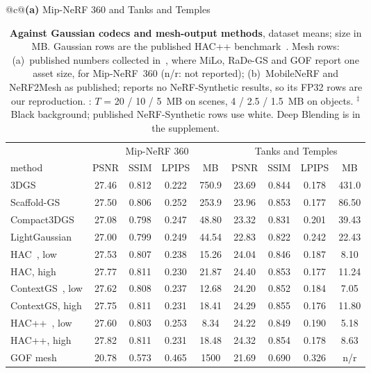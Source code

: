 \begin{table}[t]\centering\footnotesize
\caption{\textbf{Against Gaussian codecs and mesh-output methods}, dataset means; size in MB. Gaussian rows are the published HAC++ benchmark~\cite{hacpp2025}. Mesh rows: (a)~published numbers collected in~\cite{meshsplatting2025}, where MiLo, RaDe-GS and GOF report one asset size, for Mip-NeRF~360 (n/r: not reported); (b)~MobileNeRF and NeRF2Mesh as published; \MS reports no NeRF-Synthetic results, so its FP32 rows are our reproduction. \BM: $T$ = 20 / 10 / 5~MB on scenes, 4 / 2.5 / 1.5~MB on objects. $^\ddagger$Black background; published NeRF-Synthetic rows use white. Deep Blending is in the supplement.}
\label{tab:cross}
\setlength{\tabcolsep}{2.2pt}
\begin{tabular}[t]{@{}c@{}}\textbf{(a)} Mip-NeRF 360 and Tanks and Temples\\[2pt]
\begin{tabular}[t]{@{}lcccccccc@{}}
\toprule
 & \multicolumn{4}{c}{Mip-NeRF 360} & \multicolumn{4}{c}{Tanks and Temples} \\
\cmidrule(lr){2-5}\cmidrule(lr){6-9}
method & PSNR & SSIM & LPIPS & MB & PSNR & SSIM & LPIPS & MB \\
\midrule
3DGS~\cite{kerbl2023gaussians} & 27.46 & 0.812 & 0.222 & 750.9 & 23.69 & 0.844 & 0.178 & 431.0 \\
Scaffold-GS~\cite{scaffold2024} & 27.50 & 0.806 & 0.252 & 253.9 & 23.96 & 0.853 & 0.177 & 86.50 \\
Compact3DGS~\cite{compact3dgs2024} & 27.08 & 0.798 & 0.247 & 48.80 & 23.32 & 0.831 & 0.201 & 39.43 \\
LightGaussian~\cite{lightgaussian2024} & 27.00 & 0.799 & 0.249 & 44.54 & 22.83 & 0.822 & 0.242 & 22.43 \\
HAC~\cite{hac2024}, low & 27.53 & 0.807 & 0.238 & 15.26 & 24.04 & 0.846 & 0.187 & 8.10 \\
HAC, high & 27.77 & 0.811 & 0.230 & 21.87 & 24.40 & 0.853 & 0.177 & 11.24 \\
ContextGS~\cite{contextgs2024}, low & 27.62 & 0.808 & 0.237 & 12.68 & 24.20 & 0.852 & 0.184 & 7.05 \\
ContextGS, high & 27.75 & 0.811 & 0.231 & 18.41 & 24.29 & 0.855 & 0.176 & 11.80 \\
HAC++~\cite{hacpp2025}, low & 27.60 & 0.803 & 0.253 & 8.34 & 24.22 & 0.849 & 0.190 & 5.18 \\
HAC++, high & 27.82 & 0.811 & 0.231 & 18.48 & 24.32 & 0.854 & 0.178 & 8.63 \\
\midrule
GOF mesh~\cite{gof2024} & 20.78 & 0.573 & 0.465 & 1500 & 21.69 & 0.690 & 0.326 & n/r \\

\end{tabular}
\end{tabular}
\end{table}
